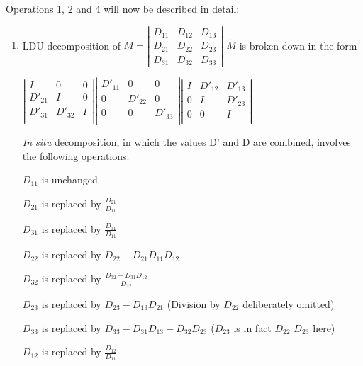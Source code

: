 Operations 1, 2 and 4 will now be described in detail:

\begin{enumerate}


  \item LDU decomposition of $\tilde{M}=\left|
    \begin{array}{ccc}
      {D_{11} } & {D_{12}} & {D_{13} } \\
      {D_{21} } & {D_{22} } & {D_{23} } \\
      {D_{31} } & {D_{32} } & {D_{33} }
    \end{array}\right|$
  $ \tilde{M}$ is broken down in the form

  $\left|\begin{array}{ccc}
    I & 0 & 0 \\
    D'_{21} & I & 0 \\
    D'_{31} & D'_{32} & I \\
   \end{array}\right|
   \left|\begin{array}{ccc}
     D'_{11} & 0 & 0 \\
     0 & D'_{22} & 0 \\
     0 & 0 & D'_{33} \\
   \end{array}\right|
   \left|\begin{array}{ccc}
     I & D'_{12} & D'_{13} \\
     0 & I & D'_{23} \\
     0 & 0 & I \\
   \end{array}\right|$

\textit{In situ} decomposition, in which the values D' and D are combined,
involves the following operations:

$D_{11}$ is unchanged.

$D_{21}$ is replaced by $\frac{D_{21}}{D_{11}}$

$D_{31}$ is replaced by $\frac{D_{31}}{D_{11}}$

$D_{22}$ is replaced by $D_{22}- D_{21}D_{11}D_{12}$

$D_{32}$ is replaced by $\frac{D_{32}-D_{31}D_{12}}{D_{22}}$

$D_{23}$ is replaced by $D_{23} - D_{13}D_{21}$ (Division by $D_{22}$
deliberately omitted)

$D_{33}$ is replaced by $D_{33} - D_{31}D_{13} - D_{32}D_{23}$  ($D_{23}$ is in
fact $D_{22}$ $D_{23}$ here)

$D_{12}$ is replaced by $\frac{D_{12}}{D_{11}}$


\end{enumerate}
